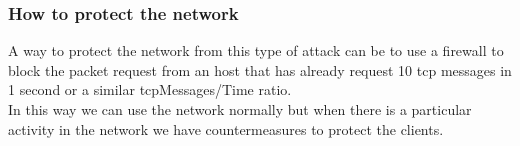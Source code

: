 \subsubsection{How to protect the network}
A way to protect the network from this type of attack can be to use a firewall to block the packet request from an host that has already request 10 tcp messages in 1 second or a similar tcpMessages/Time ratio.\\
In this way we can use the network normally but when there is a particular activity in the network we have countermeasures to protect the clients.\par
